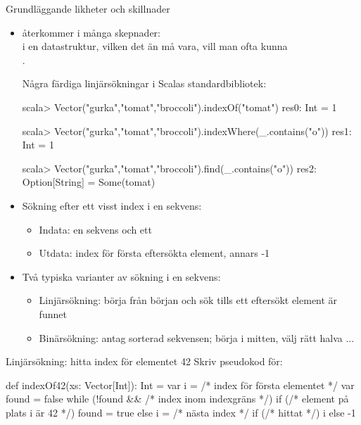 


\begin{Slide}{Grundläggande likheter och skillnader}\SlideFontSmall

\begin{itemize}
\item {} återkommer i många skepnader: \\ i en datastruktur, vilken det än må vara, vill man ofta kunna \\ . 

\pause
Några färdiga linjärsökningar i Scalas standardbibliotek:

\begin{REPL}
scala> Vector("gurka","tomat","broccoli").indexOf("tomat")
res0: Int = 1

scala> Vector("gurka","tomat","broccoli").indexWhere(_.contains("o"))
res1: Int = 1

scala> Vector("gurka","tomat","broccoli").find(_.contains("o"))
res2: Option[String] = Some(tomat)
\end{REPL}

\pause
\item Sökning efter ett visst index i en sekvens:

\begin{itemize}\SlideFontTiny
\item Indata: en sekvens och ett 
\item Utdata: index för första eftersökta element, annars -1 
\end{itemize}

\pause
\item Två typiska varianter av sökning i en sekvens:
\begin{itemize}\SlideFontTiny
\item Linjärsökning: börja från början och sök tills ett eftersökt element är funnet
\item Binärsökning: antag sorterad sekvensen; börja i mitten, välj rätt halva ...
\end{itemize}
\end{itemize}
\end{Slide}


\begin{Slide}{Linjärsökning: hitta index för elementet 42}
Skriv pseudokod för:\\ 
\pause
\begin{Code}
def indexOf42(xs: Vector[Int]): Int = {
  var i = /* index för första elementet */
  var found = false
  while (!found && /* index inom indexgräns */) {
    if (/* element på plats i är 42 */) found = true 
    else i = /* nästa index */
  }
  if (/* hittat */) i else -1
} 
\end{Code}
\end{Slide}

